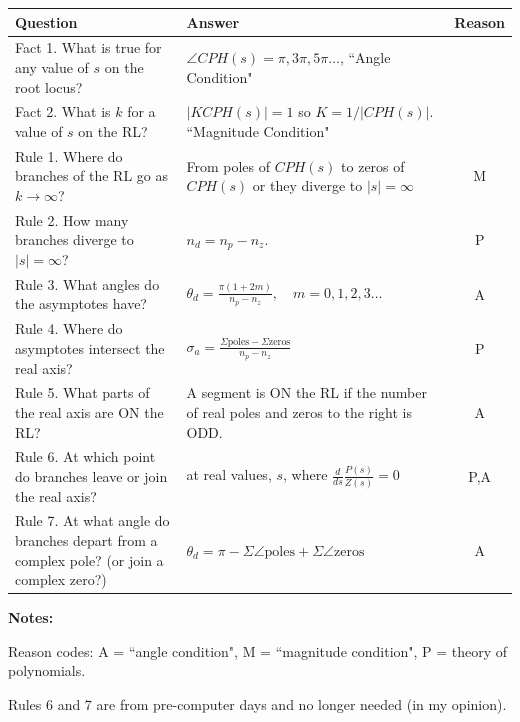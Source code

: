 \renewcommand\arraystretch{2.5}%
\begin{tabular}{p{2.5in}|p{2.5in}|c}
Question			&  Answer			& Reason	\\ \hline \hline
Fact 1. What is true for any value of $s$ on the root locus?
				&  $\angle{CPH(s)} = \pi, 3\pi, 5\pi \dots$, ``Angle Condition" &     \\ \hline
Fact 2. What is $k$ for a value of $s$ on the RL?  &
$|KCPH(s)| = 1$ so $ K = 1/|CPH(s)|$. ``Magnitude Condition"                          &     \\ \hline\hline
Rule 1. Where do branches of the RL go as $k \to \infty$?  &
From poles of $CPH(s)$ to zeros of $CPH(s)$ or they diverge to $|s| = \infty$         & M     \\ \hline
Rule 2. How many branches diverge to  $|s| = \infty$?      &
$n_d = n_p-n_z$.                                                                & P      \\ \hline
Rule 3. What angles do the asymptotes have?                 &
$\theta_d = \frac{\pi(1+2m)}{n_p-n_z},\quad m= 0,1,2,3\dots$                    & A      \\ \hline
Rule 4. Where do asymptotes intersect the real axis?        &
$\sigma_a = \frac{\Sigma\mathrm{poles}- \Sigma\mathrm{zeros}}{n_p-n_z} $        & P      \\ \hline
Rule 5. What parts of the real axis are ON the RL?          &
A segment is ON the RL if the number of real poles and zeros to the right is ODD. & A     \\ \hline \hline
Rule 6. At which point do branches leave or join the real axis?    &
at real values, $s$, where $\frac{d}{ds}\frac{P(s)}{Z(s)}=0$                      & P,A    \\ \hline
Rule 7. At what angle do branches depart from a complex pole? (or join a complex zero?) &
$\theta_d = \pi-\Sigma\angle\mathrm{poles} + \Sigma\angle\mathrm{zeros} $           & A      \\ \hline
\end{tabular}


{\bf Notes:}

Reason codes:
A = ``angle condition", M = ``magnitude condition", P = theory of polynomials.

Rules 6 and 7 are from pre-computer days and no longer needed (in my opinion).













